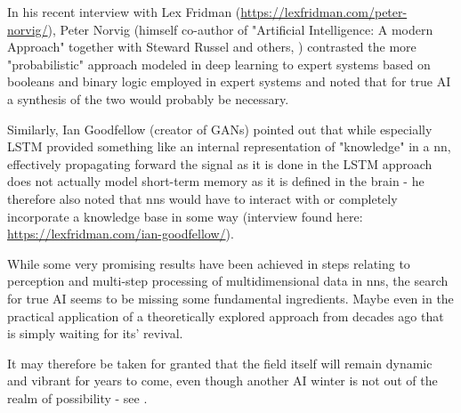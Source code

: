 In his recent interview with Lex Fridman (\url{https://lexfridman.com/peter-norvig/}), Peter Norvig (himself co-author of "Artificial Intelligence: A modern Approach" together with Steward Russel and others, \cite{russell2002artificial} ) contrasted the more "probabilistic" approach modeled in deep learning to expert systems based on booleans and binary logic employed in expert systems and noted that for true \ac{AI} a synthesis of the two would probably be necessary.

Similarly, Ian Goodfellow (creator of \acp{GAN}) pointed out that while especially \ac{LSTM} provided something like an internal representation of "knowledge" in a \ac{nn}, effectively propagating forward the signal as it is done in the \ac{LSTM} approach does not actually model short-term memory as it is defined in the brain - he therefore also noted that \acp{nn} would have to interact with or completely incorporate a knowledge base in some way (interview found here: \url{https://lexfridman.com/ian-goodfellow/}).

While some very promising results have been achieved in steps relating to perception and multi-step processing of multidimensional data in \acp{nn}, the search for true \ac{AI} seems to be missing some fundamental ingredients. Maybe even in the practical application of a theoretically explored approach from decades ago that is simply waiting for its' revival.

It may therefore be taken for granted that the field itself will remain dynamic and vibrant for years to come, even though another \ac{AI} winter is not out of the realm of possibility - see \cite{schuchmann2019analyzing}.
